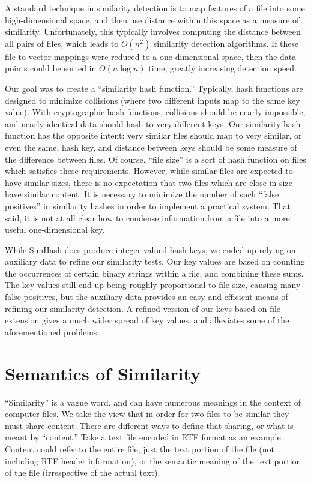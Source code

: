\documentclass[10pt, twocolumn]{article}
\begin{document}
A standard technique in similarity detection is to map features of a file into some high-dimensional space, and then use distance within this space as a measure of similarity.  Unfortunately, this typically involves computing the distance between all pairs of files, which leads to $O(n^2)$ similarity detection algorithms.  If these file-to-vector mappings were reduced to a one-dimensional space, then the data points could be sorted in $O(n \log n)$ time, greatly increasing detection speed.

Our goal was to create a ``similarity hash function.''  Typically, hash functions are designed to minimize collisions (where two different inputs map to the same key value).  With cryptographic hash functions, collisions should be nearly impossible, and nearly identical data should hash to very different keys.  Our similarity hash function has the opposite intent: very similar files should map to very similar, or even the same, hash key, and distance between keys should be some measure of the difference between files.  Of course, ``file size'' is a sort of hash function on files which satisfies these requirements.  However, while similar files are expected to have similar sizes, there is no expectation that two files which are close in size have similar content.  It is necessary to minimize the number of such ``false positives'' in similarity hashes in order to implement a practical system.  That said, it is not at all clear how to condense information from a file into a more useful one-dimensional key.

While SimHash does produce integer-valued hash keys, we ended up relying on auxiliary data to refine our similarity tests.  Our key values are based on counting the occurrences of certain binary strings within a file, and combining these sums.  The key values still end up being roughly proportional to file size, causing many false positives, but the auxiliary data provides an easy and efficient means of refining our similarity detection.  A refined version of our keys based on file extension gives a much wider spread of key values, and alleviates some of the aforementioned problems.


\section{Semantics of Similarity}

``Similarity'' is a vague word, and can have numerous meanings in the context of computer files. We take the view that in order for two files to be similar they must share content. There are different ways to define that sharing, or what is meant by ``content.'' Take a text file encoded in RTF format as an example. Content could refer to the entire file, just the text portion of the file (not including RTF header information), or the semantic meaning of the text portion of the file (irrespective of the actual text). 
\end{document}
